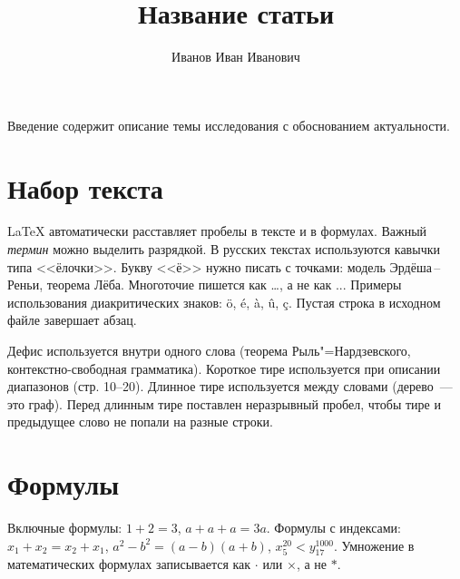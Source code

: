 \documentclass{stud-conf-pmk}
\begin{document}

\begin{paper}
\author[Иванов И.\,И.]{Иванов Иван Иванович}
\title{Название статьи}
\maketitle

\introduction

Введение содержит описание темы исследования с обоснованием актуальности.

\section{Набор текста}

\LaTeX{} автоматически расставляет пробелы в тексте и в формулах.
Важный \emph{термин} можно выделить разрядкой. В русских текстах
используются кавычки типа <<ёлочки>>. Букву <<ё>> нужно писать с точками: модель Эрдёша\,--\,Реньи, теорема Лёба. Многоточие пишется как
\dots, а не как ... Примеры использования диакритических знаков: \"{o},
\'{e}, \`{a}, \^{u}, \c{c}. Пустая строка в исходном файле завершает
абзац.

Дефис используется внутри одного слова (теорема Рыль"=Нардзевского,
контекстно-свободная грамматика). Короткое тире используется при описании
диапазонов (стр. 10--20). Длинное тире используется между словами
(дерево~--- это граф). Перед длинным тире поставлен неразрывный пробел,
чтобы тире и предыдущее слово не попали на разные строки.

\section{Формулы}

Включные формулы: $1+2=3$, $a+a+a=3a$. Формулы с индексами:
$x_1+x_2=x_2+x_1$, $a^2-b^2=(a-b)(a+b)$, $x_5^{20}<y_{17}^{1000}$.
Умножение в математических формулах записывается как $\cdot$ или $\times$,
а не $*$.


\end{paper}
\end{document}
